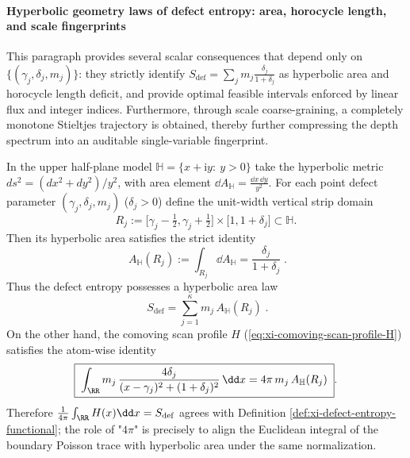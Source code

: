 \paragraph{Hyperbolic geometry laws of defect entropy: area, horocycle length, and scale fingerprints}
This paragraph provides several scalar consequences that depend only on \(\{(\gamma_j,\delta_j,m_j)\}\): they strictly identify
\(\displaystyle S_{\mathrm{def}}=\sum_j m_j\frac{\delta_j}{1+\delta_j}\)
as hyperbolic area and horocycle length deficit, and provide optimal feasible intervals enforced by linear flux and integer indices.
Furthermore, through scale coarse-graining, a completely monotone Stieltjes trajectory is obtained, thereby further compressing the depth spectrum into an auditable single-variable fingerprint.

\begin{proposition}\label{prop:xi-defect-entropy-hyperbolic-area-law-4pi}
In the upper half-plane model \(\mathbb{H}=\{x+\mathrm{i}y:\ y>0\}\) take the hyperbolic metric
\(
ds^2=(dx^2+dy^2)/y^2
\), with area element
\(
\dd A_{\mathbb{H}}=\frac{\dd x\,\dd y}{y^2}
\).
For each point defect parameter \((\gamma_j,\delta_j,m_j)\) (\(\delta_j>0\)) define the unit-width vertical strip domain
\[
R_j:=
\bigl[\gamma_j-\tfrac12,\gamma_j+\tfrac12\bigr]\times\bigl[1,1+\delta_j\bigr]\subset\mathbb{H}.
\]
Then its hyperbolic area satisfies the strict identity
\begin{equation}\label{eq:xi-hyperbolic-area-vertical-strip}
\boxed{\;
A_{\mathbb{H}}(R_j)
:=\int_{R_j}\dd A_{\mathbb{H}}
=\frac{\delta_j}{1+\delta_j}\; }.
\end{equation}
Thus the defect entropy possesses a hyperbolic area law
\begin{equation}\label{eq:xi-defect-entropy-hyperbolic-area-law}
\boxed{\;
S_{\mathrm{def}}
=\sum_{j=1}^{\kappa}m_j\,A_{\mathbb{H}}(R_j)\; }.
\end{equation}
On the other hand, the comoving scan profile \(H\) (\eqref{eq:xi-comoving-scan-profile-H}) satisfies the atom-wise identity
\begin{equation}\label{eq:xi-atom-mass-4pi-area-alignment}
\boxed{\;
\int_{\RR} m_j\,\frac{4\delta_j}{(x-\gamma_j)^2+(1+\delta_j)^2}\,\dd x
=4\pi\,m_j\,A_{\mathbb{H}}(R_j)\; }.
\end{equation}
Therefore
\(
\frac{1}{4\pi}\int_{\RR}H(x)\dd x
=S_{\mathrm{def}}
\)
agrees with Definition \ref{def:xi-defect-entropy-functional};
the role of "\(4\pi\)" is precisely to align the Euclidean integral of the boundary Poisson trace with hyperbolic area under the same normalization.
\end{proposition}

